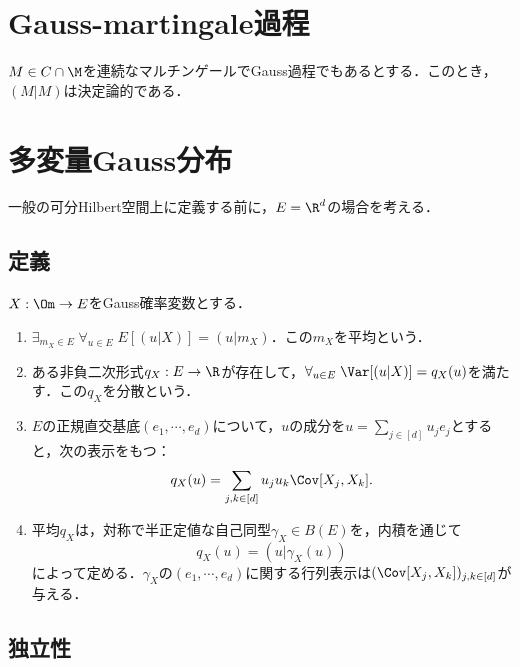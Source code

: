 \documentclass[uplatex,dvipdfmx]{jsreport}
\begin{document}
\section{Gauss-martingale過程}

\begin{proposition}
    $M\in C\cap\M$を連続なマルチンゲールでGauss過程でもあるとする．このとき，$(M|M)$は決定論的である．
\end{proposition}

\section{多変量Gauss分布}

\begin{tcolorbox}[colframe=ForestGreen, colback=ForestGreen!10!white,breakable,colbacktitle=ForestGreen!40!white,coltitle=black,fonttitle=\bfseries\sffamily,
title=]
    一般の可分Hilbert空間上に定義する前に，$E=\R^d$の場合を考える．
\end{tcolorbox}

\subsection{定義}

\begin{definition}
    $X:\Om\to E$をGauss確率変数とする．
    \begin{enumerate}
        \item $\exists_{m_X\in E}\;\forall_{u\in E}\;E[(u|X)]=(u|m_X)$．この$m_X$を平均という．
        \item ある非負二次形式$q_X:E\to\R$が存在して，$\forall_{u\in E}\;\Var[(u|X)]=q_X(u)$を満たす．この$q_X$を分散という．
        \item $E$の正規直交基底$(e_1,\cdots,e_d)$について，$u$の成分を$u=\sum_{j\in[d]}u_je_j$とすると，次の表示をもつ：
        \[q_X(u)=\sum_{j,k\in[d]}u_ju_k\Cov[X_j,X_k].\]
        \item 平均$q_X$は，対称で半正定値な自己同型$\gamma_X\in B(E)$を，内積を通じて
        \[q_X(u)=(u|\gamma_X(u))\]
        によって定める．$\gamma_X$の$(e_1,\cdots,e_d)$に関する行列表示は$(\Cov[X_j,X_k])_{j,k\in[d]}$が与える．
    \end{enumerate}
\end{definition}

\subsection{独立性}
\end{document}

